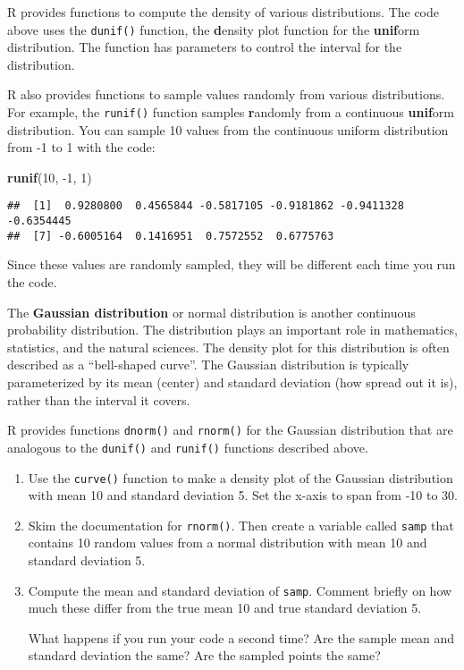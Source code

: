 \documentclass[
]{article}
\newenvironment{Shaded}{\begin{snugshade}}{\end{snugshade}}
\newcommand{\DecValTok}[1]{\textcolor[rgb]{0.00,0.00,0.81}{#1}}
\newcommand{\KeywordTok}[1]{\textcolor[rgb]{0.13,0.29,0.53}{\textbf{#1}}}
\newcommand{\NormalTok}[1]{#1}
\begin{document}
R provides functions to compute the density of various distributions.
The code above uses the \texttt{dunif()} function, the \textbf{d}ensity
plot function for the \textbf{unif}orm distribution. The function has
parameters to control the interval for the distribution.

R also provides functions to sample values randomly from various
distributions. For example, the \texttt{runif()} function samples
\textbf{r}andomly from a continuous \textbf{unif}orm distribution. You
can sample 10 values from the continuous uniform distribution from -1 to
1 with the code:

\begin{Shaded}
\begin{Highlighting}[]
\KeywordTok{runif}\NormalTok{(}\DecValTok{10}\NormalTok{, }\DecValTok{{-}1}\NormalTok{, }\DecValTok{1}\NormalTok{)}
\end{Highlighting}
\end{Shaded}

\begin{verbatim}
##  [1]  0.9280800  0.4565844 -0.5817105 -0.9181862 -0.9411328 -0.6354445
##  [7] -0.6005164  0.1416951  0.7572552  0.6775763
\end{verbatim}

Since these values are randomly sampled, they will be different each
time you run the code.

The \textbf{Gaussian distribution} or normal distribution is another
continuous probability distribution. The distribution plays an important
role in mathematics, statistics, and the natural sciences. The density
plot for this distribution is often described as a ``bell-shaped
curve''. The Gaussian distribution is typically parameterized by its
mean (center) and standard deviation (how spread out it is), rather than
the interval it covers.

R provides functions \texttt{dnorm()} and \texttt{rnorm()} for the
Gaussian distribution that are analogous to the \texttt{dunif()} and
\texttt{runif()} functions described above.

\begin{enumerate}
\def\labelenumi{\arabic{enumi}.}
\item
  Use the \texttt{curve()} function to make a density plot of the
  Gaussian distribution with mean 10 and standard deviation 5. Set the
  x-axis to span from -10 to 30.
\item
  Skim the documentation for \texttt{rnorm()}. Then create a variable
  called \texttt{samp} that contains 10 random values from a normal
  distribution with mean 10 and standard deviation 5.
\item
  Compute the mean and standard deviation of \texttt{samp}. Comment
  briefly on how much these differ from the true mean 10 and true
  standard deviation 5.

  What happens if you run your code a second time? Are the sample mean
  and standard deviation the same? Are the sampled points the same?
\end{enumerate}
\end{document}
